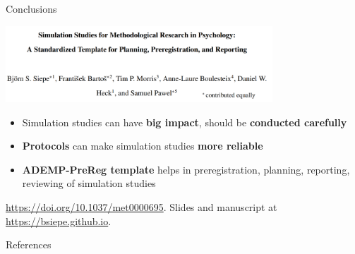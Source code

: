 \documentclass[english, 12pt, aspectratio=169]{beamer}
\begin{document}
\begin{frame}{Conclusions}

  \begin{block}{}
    \centering
    \includegraphics[width = 0.75\textwidth,frame]{pics/siepeetal.png}

    \begin{itemize}
    \pause
      \item Simulation studies can have \alert{\textbf{big impact}}, should be
            \alert{\textbf{conducted carefully}}
      \pause
      \item \alert{\textbf{Protocols}} can make simulation studies
            \alert{\textbf{more reliable}}
      \pause
      \item \alert{\textbf{ADEMP-PreReg template}} helps in preregistration,
            planning, reporting, reviewing of simulation studies
    \end{itemize}
  \end{block}

  {\tiny \color{gray} \href{https://doi.org/10.1037/met0000695}{https://doi.org/10.1037/met0000695}. Slides and manuscript at \href{https://bsiepe.github.io}{https://bsiepe.github.io}.}
\end{frame}

\begin{frame}[allowframebreaks]{References}
\scriptsize
  
  
\end{frame}
\end{document}
